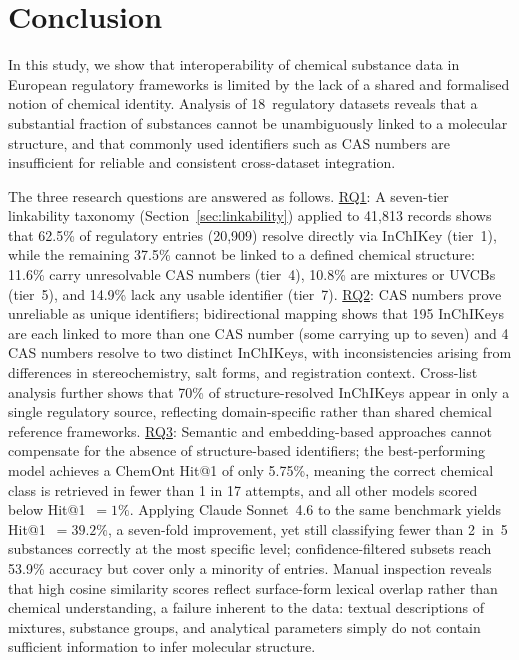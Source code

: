 \section{Conclusion}
\label{sec:conclusion}
In this study, we show that interoperability of chemical substance data in European regulatory frameworks is limited by the lack of a shared and formalised notion of chemical identity. Analysis of 18~regulatory datasets reveals that a substantial fraction of substances cannot be unambiguously linked to a molecular structure, and that commonly used identifiers such as CAS numbers are insufficient for reliable and consistent cross-dataset integration.

The three research questions are answered as follows. \hyperref[sec:question1]{RQ1}: A seven-tier linkability taxonomy (Section~\ref{sec:linkability}) applied to 41,813 records shows that 62.5\% of regulatory entries (20,909) resolve directly via InChIKey (tier~1), while the remaining 37.5\% cannot be linked to a defined chemical structure: 11.6\% carry unresolvable CAS numbers (tier~4), 10.8\% are mixtures or UVCBs (tier~5), and 14.9\% lack any usable identifier (tier~7). \hyperref[sec:question2]{RQ2}: CAS numbers prove unreliable as unique identifiers; bidirectional mapping shows that 195 InChIKeys are each linked to more than one CAS number (some carrying up to seven) and 4 CAS numbers resolve to two distinct InChIKeys, with inconsistencies arising from differences in stereochemistry, salt forms, and registration context. Cross-list analysis further shows that 70\% of structure-resolved InChIKeys appear in only a single regulatory source, reflecting domain-specific rather than shared chemical reference frameworks. \hyperref[sec:question3]{RQ3}: Semantic and embedding-based approaches cannot compensate for the absence of structure-based identifiers; the best-performing model achieves a ChemOnt Hit@1 of only 5.75\%, meaning the correct chemical class is retrieved in fewer than 1 in 17 attempts, and all other models scored below Hit@1~$= 1\%$. Applying Claude Sonnet~4.6 to the same benchmark yields Hit@1~$= 39.2\%$, a seven-fold improvement, yet still classifying fewer than 2~in~5 substances correctly at the most specific level; confidence-filtered subsets reach 53.9\% accuracy but cover only a minority of entries. Manual inspection reveals that high cosine similarity scores reflect surface-form lexical overlap rather than chemical understanding, a failure inherent to the data: textual descriptions of mixtures, substance groups, and analytical parameters simply do not contain sufficient information to infer molecular structure.

